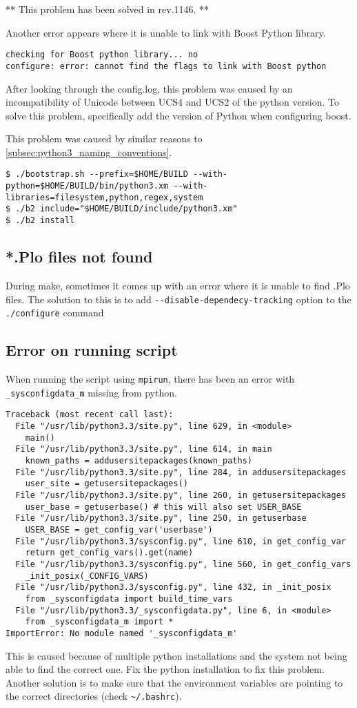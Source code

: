 ** This problem has been solved in rev.1146. **

Another error appears where it is unable to link with Boost Python library.
\begin{lstlisting}[style=inlineBash]
checking for Boost python library... no
configure: error: cannot find the flags to link with Boost python
\end{lstlisting}
After looking through the config.log, this problem was caused by an incompatibility of Unicode between UCS4 and UCS2 of the python version. To solve this problem, specifically add the version of Python when configuring boost.

This problem was caused by similar reasons to \ref{subsec:python3_naming_conventions}.
\begin{lstlisting}[style=inlineBash]
$ ./bootstrap.sh --prefix=$HOME/BUILD --with-python=$HOME/BUILD/bin/python3.xm --with-libraries=filesystem,python,regex,system
$ ./b2 include="$HOME/BUILD/include/python3.xm"
$ ./b2 install
\end{lstlisting}

\subsection{*.Plo files not found} %
\label{sub:_plo_files_not_found}

During make, sometimes it comes up with an error where it is unable to find .Plo files. The solution to this is to add \lstinline{--disable-dependecy-tracking} option to the \lstinline{./configure} command

\subsection{Error on running script} %
\label{sub:error_on_running_script}

When running the script using \lstinline{mpirun}, there has been an error with \lstinline{_sysconfigdata_m} missing from python.

\begin{lstlisting}[style=inlineBash]
Traceback (most recent call last):
  File "/usr/lib/python3.3/site.py", line 629, in <module>
    main()
  File "/usr/lib/python3.3/site.py", line 614, in main
    known_paths = addusersitepackages(known_paths)
  File "/usr/lib/python3.3/site.py", line 284, in addusersitepackages
    user_site = getusersitepackages()
  File "/usr/lib/python3.3/site.py", line 260, in getusersitepackages
    user_base = getuserbase() # this will also set USER_BASE
  File "/usr/lib/python3.3/site.py", line 250, in getuserbase
    USER_BASE = get_config_var('userbase')
  File "/usr/lib/python3.3/sysconfig.py", line 610, in get_config_var
    return get_config_vars().get(name)
  File "/usr/lib/python3.3/sysconfig.py", line 560, in get_config_vars
    _init_posix(_CONFIG_VARS)
  File "/usr/lib/python3.3/sysconfig.py", line 432, in _init_posix
    from _sysconfigdata import build_time_vars
  File "/usr/lib/python3.3/_sysconfigdata.py", line 6, in <module>
    from _sysconfigdata_m import *
ImportError: No module named '_sysconfigdata_m'
\end{lstlisting}

This is caused because of multiple python installations and the system not being able to find the correct one. Fix the python installation to fix this problem. Another solution is to make sure that the environment variables are pointing to the correct directories (check \lstinline{~/.bashrc}).

